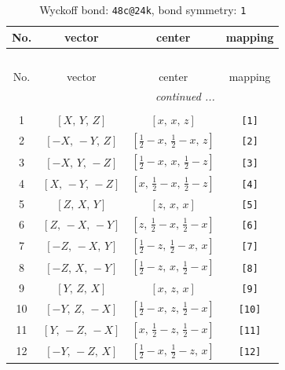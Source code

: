 \documentclass[fleqn,8pt]{jsarticle}
\begin{document}
\begin{longtable}{cccc}
\caption{Wyckoff bond: {\tt 48c@24k}, bond symmetry: {\tt 1}}
 \\
 \hline \hline
No. & vector & center & mapping \\ \hline \endfirsthead

\multicolumn{3}{l}{\tablename\ \thetable{}} \\
 \hline \hline
No. & vector & center & mapping \\ \hline \endhead

 \hline \hline
\multicolumn{3}{r}{\footnotesize\it continued ...} \\ \endfoot

 \hline \hline
\multicolumn{3}{r}{} \\ \endlastfoot

1 & $\left[ X,\, Y,\, Z \right]$ & $\left[ x,\, x,\, z \right]$ & {\tt [1]} \\ \hline
2 & $\left[ - X,\, - Y,\, Z \right]$ & $\left[ \frac{1}{2} - x,\, \frac{1}{2} - x,\, z \right]$ & {\tt [2]} \\ \hline
3 & $\left[ - X,\, Y,\, - Z \right]$ & $\left[ \frac{1}{2} - x,\, x,\, \frac{1}{2} - z \right]$ & {\tt [3]} \\ \hline
4 & $\left[ X,\, - Y,\, - Z \right]$ & $\left[ x,\, \frac{1}{2} - x,\, \frac{1}{2} - z \right]$ & {\tt [4]} \\ \hline
5 & $\left[ Z,\, X,\, Y \right]$ & $\left[ z,\, x,\, x \right]$ & {\tt [5]} \\ \hline
6 & $\left[ Z,\, - X,\, - Y \right]$ & $\left[ z,\, \frac{1}{2} - x,\, \frac{1}{2} - x \right]$ & {\tt [6]} \\ \hline
7 & $\left[ - Z,\, - X,\, Y \right]$ & $\left[ \frac{1}{2} - z,\, \frac{1}{2} - x,\, x \right]$ & {\tt [7]} \\ \hline
8 & $\left[ - Z,\, X,\, - Y \right]$ & $\left[ \frac{1}{2} - z,\, x,\, \frac{1}{2} - x \right]$ & {\tt [8]} \\ \hline
9 & $\left[ Y,\, Z,\, X \right]$ & $\left[ x,\, z,\, x \right]$ & {\tt [9]} \\ \hline
10 & $\left[ - Y,\, Z,\, - X \right]$ & $\left[ \frac{1}{2} - x,\, z,\, \frac{1}{2} - x \right]$ & {\tt [10]} \\ \hline
11 & $\left[ Y,\, - Z,\, - X \right]$ & $\left[ x,\, \frac{1}{2} - z,\, \frac{1}{2} - x \right]$ & {\tt [11]} \\ \hline
12 & $\left[ - Y,\, - Z,\, X \right]$ & $\left[ \frac{1}{2} - x,\, \frac{1}{2} - z,\, x \right]$ & {\tt [12]} \\ \hline

\end{longtable}
\end{document}
